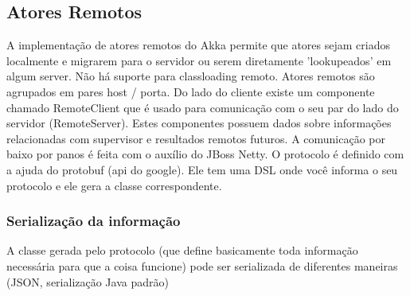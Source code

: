 \documentclass[]{article}
\begin{document}
		\subsection{Atores Remotos}
		A implementação de atores remotos do Akka permite que atores sejam criados localmente e migrarem para o servidor
		ou serem diretamente 'lookupeados' em algum server. Não há suporte para classloading remoto. Atores remotos
		são agrupados em pares host / porta. Do lado do cliente existe um componente chamado RemoteClient que é
		usado para comunicação com o seu par do lado do servidor (RemoteServer). Estes componentes possuem dados
		sobre informações relacionadas com supervisor e resultados remotos futuros. A comunicação por baixo por panos
		é feita com o auxílio do JBoss Netty. O protocolo é definido com a ajuda do protobuf (api do google). 
		Ele tem uma DSL onde você informa o seu protocolo e ele gera a classe correspondente. 
		
		\subsubsection{Serialização da informação}
		A classe gerada pelo protocolo (que define basicamente toda informação necessária para que a coisa funcione)
		pode ser serializada de diferentes maneiras (JSON, serialização Java padrão)
			 
\newpage


\end{document}
